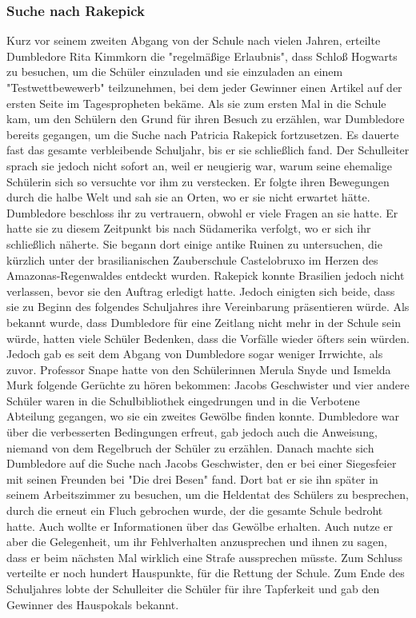 \documentclass[a4paper, 10pt]{article}
\begin{document}
\subsubsection*{Suche nach Rakepick}
Kurz vor seinem zweiten Abgang von der Schule nach vielen Jahren, erteilte Dumbledore Rita Kimmkorn die "regelmäßige Erlaubnis", dass Schloß Hogwarts zu besuchen, um die Schüler einzuladen und sie einzuladen an einem "Testwettbewewerb" teilzunehmen, bei dem jeder Gewinner einen Artikel auf der ersten Seite im Tagespropheten bekäme. Als sie zum ersten Mal in die Schule kam, um den Schülern den Grund für ihren Besuch zu erzählen, war Dumbledore bereits gegangen, um die Suche nach Patricia Rakepick fortzusetzen. Es dauerte fast das gesamte verbleibende Schuljahr, bis er sie schließlich fand. Der Schulleiter
sprach sie jedoch nicht sofort an, weil er neugierig war, warum seine ehemalige Schülerin sich so versuchte vor ihm zu verstecken. Er folgte ihren Bewegungen durch die halbe Welt und sah sie an Orten, wo er sie nicht erwartet hätte. Dumbledore beschloss ihr zu vertrauern, obwohl er viele Fragen an sie hatte. Er hatte sie zu diesem Zeitpunkt bis nach Südamerika verfolgt, wo er sich ihr schließlich näherte. Sie begann dort einige antike Ruinen zu untersuchen, die kürzlich unter der brasilianischen Zauberschule Castelobruxo im Herzen des Amazonas-Regenwaldes entdeckt wurden. Rakepick konnte Brasilien jedoch nicht verlassen, bevor sie den Auftrag erledigt hatte. Jedoch einigten sich beide, dass sie zu Beginn des folgendes Schuljahres ihre Vereinbarung präsentieren würde.
\vspace{10pt}
\newline
Als bekannt wurde, dass Dumbledore für eine Zeitlang nicht mehr in der Schule sein würde, hatten viele Schüler Bedenken, dass die Vorfälle wieder öfters sein würden. Jedoch gab es seit dem Abgang von Dumbledore sogar weniger Irrwichte, als zuvor. Professor Snape hatte von den Schülerinnen Merula Snyde und Ismelda Murk folgende Gerüchte zu hören bekommen: Jacobs Geschwister und vier andere Schüler waren in die Schulbibliothek eingedrungen und in die Verbotene Abteilung gegangen, wo sie ein zweites Gewölbe finden konnte. Dumbledore war über die verbesserten Bedingungen erfreut, gab jedoch auch die Anweisung, niemand von dem Regelbruch der Schüler zu erzählen. Danach machte sich Dumbledore auf die Suche nach Jacobs Geschwister, den er bei einer Siegesfeier mit seinen Freunden bei "Die drei Besen" fand. Dort bat er sie ihn später in seinem Arbeitszimmer zu besuchen, um die Heldentat des Schülers zu besprechen, durch die erneut ein Fluch gebrochen wurde, der die gesamte Schule bedroht hatte. Auch wollte er Informationen über das Gewölbe erhalten. Auch nutze er aber die Gelegenheit, um ihr Fehlverhalten anzusprechen und ihnen zu sagen, dass er beim nächsten Mal wirklich eine Strafe aussprechen müsste. Zum Schluss verteilte er noch hundert Hauspunkte, für die Rettung der Schule.
\vspace{10pt}
\newline
Zum Ende des Schuljahres lobte der Schulleiter die Schüler für ihre Tapferkeit und gab den Gewinner des Hauspokals bekannt.
\end{document}
